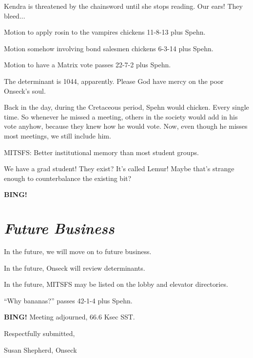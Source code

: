 \documentclass[10pt]{article}
\newcommand{\bing}{{\bf BING!} }
\newcommand{\goto}[1]{\bing \vskip 12pt \section*{{\em{#1}}}}
\newcommand{\ps}{ plus Spehn\xspace}
\begin{document}
Kendra is threatened by the chainsword until she stops reading. Our ears! They bleed...

Motion to apply rosin to the vampires chickens 11-8-13\ps.

Motion somehow involving bond salesmen chickens 6-3-14\ps.

Motion to have a Matrix vote passes 22-7-2\ps.

The determinant is 1044, apparently. Please God have mercy on the poor Onseck's soul.

Back in the day, during the Cretaceous period, Spehn would chicken. Every single time. So whenever he missed a meeting, others in the society would add in his vote anyhow, because they knew how he would vote. Now, even though he misses most meetings, we still include him.

MITSFS: Better institutional memory than most student groups.

We have a grad student!  They exist?  It's called Lemur!  Maybe that's strange enough to counterbalance the existing bit?

\goto{Future Business}

In the future, we will move on to future business.

In the future, Onseck will review determinants.

In the future, MITSFS may be listed on the lobby and elevator directories. 

``Why bananas?'' passes 42-1-4\ps.

\bing
\noindent
Meeting adjourned, 66.6 Ksec SST.

\vspace{18pt}

\centerline{Respectfully submitted,}
\centerline{Susan Shepherd, Onseck}
\end{document}
